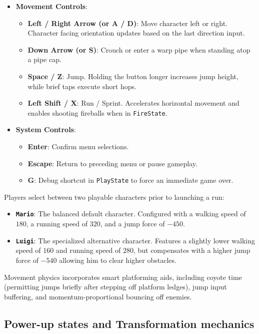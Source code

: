 \documentclass[12pt, a4paper]{article}
\begin{document}
\begin{itemize}
\item \textbf{Movement Controls}:
\begin{itemize}
\item \textbf{Left / Right Arrow (or A / D)}: Move character left or right. Character facing orientation updates based on the last direction input.
\item \textbf{Down Arrow (or S)}: Crouch or enter a warp pipe when standing atop a pipe cap.
\item \textbf{Space / Z}: Jump. Holding the button longer increases jump height, while brief taps execute short hops.
\item \textbf{Left Shift / X}: Run / Sprint. Accelerates horizontal movement and enables shooting fireballs when in \texttt{FireState}.
\end{itemize}
\newpage
\item \textbf{System Controls}:
\begin{itemize}
\item \textbf{Enter}: Confirm menu selections.
\item \textbf{Escape}: Return to preceding menu or pause gameplay.
\item \textbf{G}: Debug shortcut in \texttt{PlayState} to force an immediate game over.
\end{itemize}
\end{itemize}

Players select between two playable characters prior to launching a run:
\begin{itemize}
\item \textbf{\texttt{Mario}}: The balanced default character. Configured with a walking speed of $180$, a running speed of $320$, and a jump force of $-450$.
\item \textbf{\texttt{Luigi}}: The specialized alternative character. Features a slightly lower walking speed of $160$ and running speed of $280$, but compensates with a higher jump force of $-540$ allowing him to clear higher obstacles.
\end{itemize}

Movement physics incorporates smart platforming aids, including coyote time (permitting jumps briefly after stepping off platform ledges), jump input buffering, and momentum-proportional bouncing off enemies.

\subsection{Power-up states and Transformation mechanics}
\end{document}
